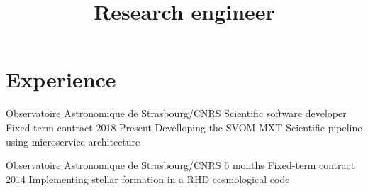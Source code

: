 \documentclass[11pt,a4paper,sans]{moderncv}
\title{Research engineer}
\newcommand{\aton}{{\texttt{ATON}}}
\begin{document}
\makecvtitle


%
%


\section{Experience}

\cventry
{Observatoire Astronomique de Strasbourg/CNRS}
{Scientific software developer}
{Fixed-term contract}
{2018-Present}
{}
{}
{Develloping the SVOM MXT Scientific pipeline using microservice architecture}


\cventry
{Observatoire Astronomique de Strasbourg/CNRS}
{6 months}
{Fixed-term contract}
{2014}
{}
{}
{Implementing stellar formation in a RHD cosmological code}


\end{document}
